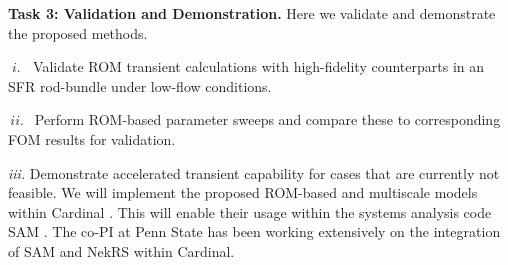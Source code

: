 \noindent
\textbf{Task 3: Validation and Demonstration.}
Here we validate and demonstrate the proposed methods.
\\[-3ex]
\begin{description}
\item{$\; i.\; \;$}
Validate ROM transient calculations with high-fidelity counterparts
in an SFR rod-bundle under low-flow conditions.
\\[-4ex]
\item{$\, ii. \,\;$}
Perform ROM-based parameter sweeps and compare these to corresponding
FOM results for validation.
\\[-4ex]
\item{\em iii.}
Demonstrate accelerated transient capability for cases that are currently not
feasible. We will implement the proposed ROM-based and multiscale models within
Cardinal \cite{cardinal}. This will enable their usage within the systems
analysis code SAM \cite{hu2021}. The co-PI at Penn State has been working
extensively on the integration of SAM and NekRS within Cardinal.
\\[-2ex]
\end{description}
